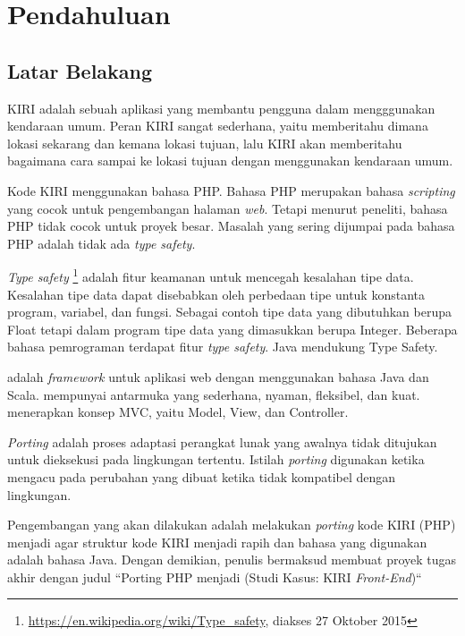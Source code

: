 \chapter{Pendahuluan}
\label{chap:pendahuluan}

\section{Latar Belakang}
\label{sec:latarbelakang}

KIRI \cite{statickiri} adalah sebuah aplikasi yang membantu pengguna dalam mengggunakan kendaraan umum. Peran KIRI sangat sederhana, yaitu memberitahu dimana lokasi sekarang dan kemana lokasi tujuan, lalu KIRI akan memberitahu bagaimana cara sampai ke lokasi tujuan dengan menggunakan kendaraan umum. 

Kode KIRI \cite{githubkiri} menggunakan bahasa PHP. Bahasa PHP \cite{phpnet} merupakan bahasa \textit{scripting} yang cocok untuk pengembangan halaman \textit{web}. Tetapi menurut peneliti, bahasa PHP tidak cocok untuk proyek besar. Masalah yang sering dijumpai pada bahasa PHP adalah tidak ada \textit{type safety}. 

\textit{Type safety} \footnote{ \url{https://en.wikipedia.org/wiki/Type_safety}, diakses 27 Oktober 2015} adalah fitur keamanan untuk mencegah kesalahan tipe data. Kesalahan tipe data dapat disebabkan oleh perbedaan tipe untuk konstanta program, variabel, dan fungsi. Sebagai contoh tipe data yang dibutuhkan berupa Float tetapi dalam program tipe data yang dimasukkan berupa Integer. Beberapa bahasa pemrograman terdapat fitur \textit{type safety}. Java mendukung Type Safety.

\play adalah \textit{framework} untuk aplikasi web dengan menggunakan bahasa Java dan Scala. \play mempunyai antarmuka yang sederhana, nyaman, fleksibel, dan kuat. \play menerapkan konsep MVC, yaitu Model, View, dan Controller\cite{playforjava}. 

\textit{Porting} adalah proses adaptasi perangkat lunak yang awalnya tidak ditujukan untuk dieksekusi pada lingkungan tertentu. Istilah \textit{porting} digunakan ketika mengacu pada perubahan yang dibuat ketika tidak kompatibel dengan lingkungan.

Pengembangan yang akan dilakukan adalah melakukan \textit{porting} kode KIRI (PHP) menjadi \play agar struktur kode KIRI menjadi rapih dan bahasa yang digunakan adalah bahasa Java. Dengan demikian, penulis bermaksud membuat proyek tugas akhir dengan judul ``Porting PHP menjadi \play (Studi Kasus: KIRI \textit{Front-End})``

